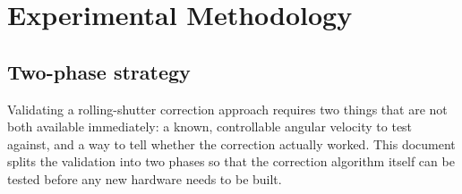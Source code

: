 \chapter{Experimental Methodology}
\label{chap:rs-methodology}

\section{Two-phase strategy}

Validating a rolling-shutter correction approach requires two things that are not both available immediately: a known, controllable angular velocity to test against, and a way to tell whether the correction actually worked. This document splits the validation into two phases so that the correction algorithm itself can be tested before any new hardware needs to be built.

